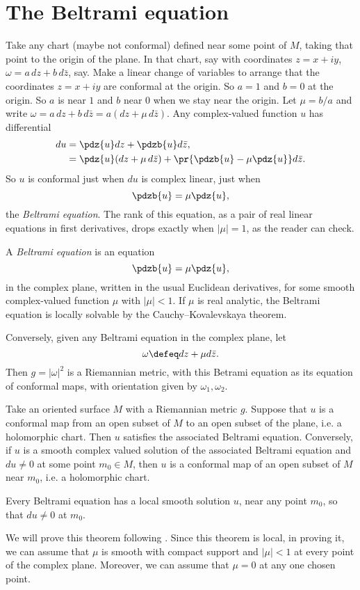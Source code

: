 \section{The Beltrami equation}
Take any chart (maybe not conformal) defined near some point of \(M\), taking that point to the origin of the plane.
In that chart, say with coordinates \(z=x+iy\), \(\omega = a \, dz + b \, d\bar{z}\), say.
Make a linear change of variables to arrange that the coordinates \(z=x+iy\) are conformal at the origin.
So \(a=1\) and \(b=0\) at the origin.
So \(a\) is near \(1\) and \(b\) near \(0\) when we stay near the origin.
Let \(\mu=b/a\) and write \(\omega=a \, dz + b \, d\bar{z}=a(dz + \mu \, d\bar{z})\).
Any complex-valued function \(u\) has differential 
\begin{align*}
du 
&=
\pdz{u} dz + \pdzb{u} d\bar{z},
\\
&=
\pdz{u} (dz+\mu\,d\bar{z}) + \pr{ \pdzb{u} - \mu \pdz{u} } d\bar{z}.
\end{align*}
So \(u\) is conformal just when \(du\) is complex linear, just when
\[
\pdzb{u} = \mu \pdz{u},
\]
the \emph{Beltrami equation}.
The rank of this equation, as a pair of real linear equations in first derivatives, drops exactly when \(|\mu|=1\), as the reader can check.

A \emph{Beltrami equation} is an equation
\[
\pdzb{u} = \mu \pdz{u},
\]
in the complex plane, written in the usual Euclidean derivatives, for some smooth complex-valued function \(\mu\) with \(|\mu|<1\).
If \(\mu\) is real analytic, the Beltrami equation is locally solvable by the Cauchy--Kovalevskaya theorem.

Conversely, given any Beltrami equation in the complex plane, let
\[
\omega\defeq dz+\mu d\bar{z}.
\]
Then \(g=|\omega|^2\) is a Riemannian metric, with this Betrami equation as its equation of conformal maps, with orientation given by \(\omega_1,\omega_2\).

\begin{theorem}
Take an oriented surface \(M\) with a Riemannian metric \(g\).
Suppose that \(u\) is a conformal map from an open subset of \(M\) to an open subset of the plane, i.e. a holomorphic chart.
Then \(u\) satisfies the associated Beltrami equation.
Conversely, if \(u\) is a smooth complex valued solution of the associated Beltrami equation and \(du \ne 0\) at some point \(m_0 \in M\), then \(u\) is a conformal map of an open subset of \(M\) near \(m_0\), i.e. a holomorphic chart.
\end{theorem}
\begin{theorem}%
Every Beltrami equation has a local smooth solution \(u\), near any point \(m_0\), so that \(du\ne 0\) at \(m_0\). 
\end{theorem}
We will prove this theorem following \cite{Douady/Buff:2000}.
Since this theorem is local, in proving it, we can assume that \(\mu\) is smooth with compact support and \(|\mu|<1\) at every point of the complex plane.
Moreover, we can assume that \(\mu=0\) at any one chosen point.

